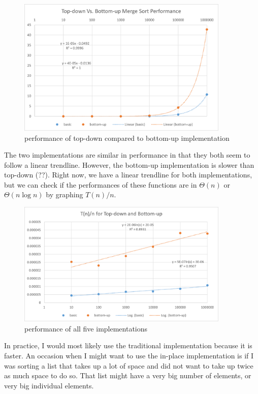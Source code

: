 \documentclass[12pt]{article}
\begin{document}
\begin{figure}[H]
\centering
\includegraphics[width=0.9\textwidth,height=\textheight,keepaspectratio]{bottom_up}
\caption{performance of top-down compared to bottom-up implementation}
\label{Figure: i1}
\end{figure}
\noindent The two implementations are similar in performance in that they both seem to follow a linear trendline. However, the bottom-up implementation is slower than top-down (??). Right now, we have a linear trendline for both implementations, but we can check if the performances of these functions are in $\Theta(n)$ or $\Theta(n\log{n})$ by graphing $T(n)/n$.

\begin{figure}[H]
\centering
\includegraphics[width=0.9\textwidth,height=\textheight,keepaspectratio]{tn_n}
\caption{performance of all five implementations}
\label{Figure: m1}
\end{figure}

In practice, I would most likely use the traditional implementation because it is faster. An occasion when I might want to use the in-place implementation is if I was sorting a list that takes up a lot of space and did not want to take up twice as much space to do so. That list might have a very big number of elements, or very big individual elements. 
\end{document}
